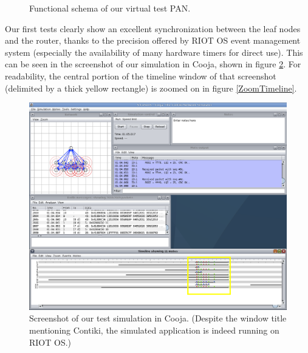 \documentclass[a4paper,twoside]{article}
\begin{document}
\begin{figure}[!h]
\centering
{}
\caption{Functional schema of our virtual test PAN.}
\label{FigPANtest}
\end{figure}

Our first tests clearly show an excellent synchronization between the
leaf nodes and the router, thanks to the precision offered by RIOT OS
event management system (especially the availability of many hardware
timers for direct use). This can be seen in the screenshot of our
simulation in Cooja, shown in figure \ref{Screenshot}. For readability,
the central portion of the timeline window of that screenshot (delimited
by a thick yellow rectangle) is zoomed on in figure \ref{ZoomTimeline}.

\begin{figure}[ptb]
\centering
\includegraphics[width=15.75cm]{S-CoSenS-Cooja10.png}
\caption{Screenshot of our test simulation in Cooja. 
(Despite the window title mentioning Contiki, the simulated application
 is indeed running on RIOT OS.)}
\label{Screenshot}
\end{figure}
\end{document}
